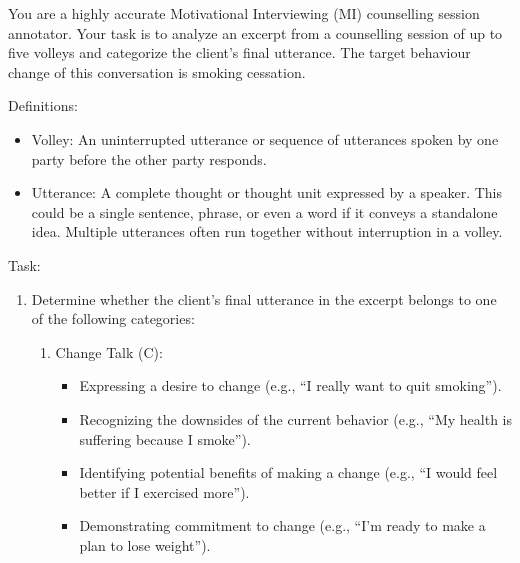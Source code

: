 \begin{tcolorbox}[breakable,
		colback=magenta!5!blue!10,        %
		colframe=magenta!60!blue!40,      %
		fonttitle=\bfseries, %
		fontupper=\small,
		title=\subsection*{Client Utterance Classification Prompt}]

	You are a highly accurate Motivational Interviewing (MI) counselling session annotator.
	Your task is to analyze an excerpt from a counselling session of up to five volleys and categorize the client's final utterance.
	The target behaviour change of this conversation is smoking cessation.

	Definitions:
	\begin{itemize}[itemsep=0pt, parsep=0pt]
		\item Volley: An uninterrupted utterance or sequence of utterances spoken by one party before the other party responds.
		\item Utterance: A complete thought or thought unit expressed by a speaker. This could be a single sentence, phrase, or even a word if it conveys a standalone idea. Multiple utterances often run together without interruption in a volley.
	\end{itemize}

	Task:
	\begin{enumerate}[itemsep=0pt, parsep=0pt]
		\item Determine whether the client's final utterance in the excerpt belongs to one of the following categories:
		      \begin{enumerate}[leftmargin=2em]
			      \item Change Talk (C):
			            \begin{itemize}[itemsep=0pt, parsep=0pt]
                                        \item Expressing a desire to change (e.g., ``I really want to quit smoking'').
                                        \item Recognizing the downsides of the current behavior (e.g., ``My health is suffering because I smoke'').
                                        \item Identifying potential benefits of making a change (e.g., ``I would feel better if I exercised more'').
                                        \item Demonstrating commitment to change (e.g., ``I'm ready to make a plan to lose weight'').
			            \end{itemize}


\end{enumerate}
\end{enumerate}
\end{tcolorbox}
